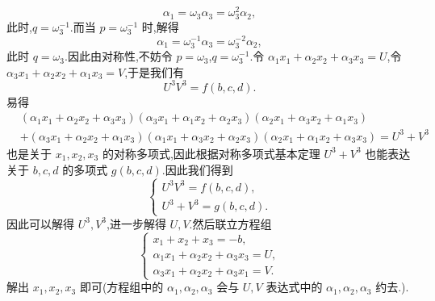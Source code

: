 \documentclass[a4paper]{article}
\begin{document}
$$
\alpha_1=\omega_3\alpha_3=\omega_3^2\alpha_2,
$$
此时,$q=\omega_3^{-1}$.而当 $p=\omega_3^{-1}$ 时,解得
$$
\alpha_1=\omega_3^{-1}\alpha_3=\omega_3^{-2}\alpha_2,
$$
此时 $q=\omega_3$.因此由对称性,不妨令
$p=\omega_3$,$q=\omega_3^{-1}$.令
$\alpha_1x_1+\alpha_2x_2+\alpha_3x_3=U$,令
$\alpha_3x_1+\alpha_2x_2+\alpha_1x_3=V$,于是我们有
$$
U^3V^3=f(b,c,d).
$$
易得
\begin{align*}
&(\alpha_1x_1+\alpha_2x_2+\alpha_3x_3)(\alpha_3x_1+\alpha_1x_2+\alpha_2x_3)(\alpha_2x_1+\alpha_3x_2+\alpha_1x_3)\\&+(\alpha_3x_1+\alpha_2x_2+\alpha_1x_3)(\alpha_1x_1+\alpha_3x_2+\alpha_2x_3)(\alpha_2x_1+\alpha_1x_2+\alpha_3x_3)=U^3+V^3
\end{align*}
也是关于 $x_1,x_2,x_3$ 的对称多项式,因此根据对称多项式基本定理
$U^3+V^3$ 也能表达关于 $b,c,d$ 的多项式
$g(b,c,d)$.因此我们得到
$$
\begin{cases}
  U^3V^3=f(b,c,d),\\
U^3+V^3=g(b,c,d).
\end{cases}
$$
因此可以解得 $U^3,V^3$,进一步解得 $U,V$.然后联立方程组
$$
\begin{cases}
  x_1+x_2+x_3=-b,\\
\alpha_1x_1+\alpha_2x_2+\alpha_3x_3=U,\\
\alpha_3x_1+\alpha_2x_2+\alpha_3x_1=V.
\end{cases}
$$
解出 $x_1,x_2,x_3$ 即可(方程组中的 $\alpha_1,\alpha_2,\alpha_3$ 会与
$U,V$ 表达式中的 $\alpha_1,\alpha_2,\alpha_3$ 约去.).
\end{document}
